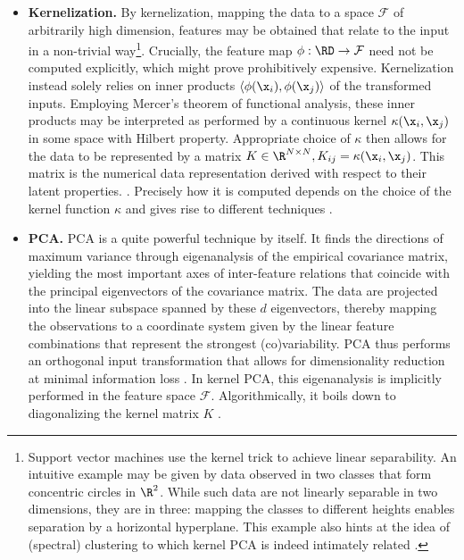 \begin{itemize}

  \item[] \textbf{Kernelization.} By kernelization, mapping the data to a 
  space $\mathcal{F}$ of arbitrarily high dimension, features may be obtained 
  that relate to the input in a non-trivial way\footnote{
  Support vector machines use the kernel trick to achieve linear separability. 
  An intuitive example may be given by data observed in two classes that form 
  concentric circles in $\R^2$. 
  While such data are not linearly separable in two dimensions, they are in three: 
  mapping the classes to different heights enables separation by a horizontal 
  hyperplane.
  This example also hints at the idea of (spectral) clustering to which kernel 
  PCA is indeed intimately related \citep{bengioetal2004}.
  }.
  Crucially, the feature map $\phi: \RD \rightarrow \mathcal{F}$ need not be 
  computed explicitly, which might prove prohibitively expensive.
  Kernelization instead solely relies on inner products $\langle \phi(\x_i), 
  \phi(\x_j) \rangle$ of the transformed inputs.
  Employing Mercer's theorem of functional analysis, these inner products may 
  be interpreted as performed by a continuous kernel 
  $\kappa(\x_i, \x_j)$ in some space with Hilbert property.
  Appropriate choice of $\kappa$ then allows for the data to be represented by a 
  matrix $K \in \R^{N \times N}, K_{ij} = \kappa(\x_i, \x_j)$.
  This matrix is the numerical data representation derived with respect to their 
  latent properties. \citep{schoelkopfetal1998}.
  Precisely how it is computed depends on the choice of the kernel function 
  $\kappa$ and gives rise to different techniques \citep{hametal2003}.
  
  \item[] \textbf{PCA.} PCA is a quite powerful technique by itself.
  It finds the directions of maximum variance through eigenanalysis of the 
  empirical covariance matrix, yielding the most important axes of inter-feature 
  relations that coincide with the principal eigenvectors of the covariance 
  matrix.
  The data are projected into the linear subspace spanned by these $d$ 
  eigenvectors, thereby mapping the observations to a coordinate system given 
  by the linear feature combinations that represent the strongest 
  (co)variability.
  PCA thus performs an orthogonal input transformation that allows for 
  dimensionality reduction at minimal information loss \citep{cayton2005}.
  In kernel PCA, this eigenanalysis is implicitly performed in the feature space 
  $\mathcal{F}$.
  Algorithmically, it boils down to diagonalizing the kernel matrix $K$ 
  \citep{schoelkopfetal1998}.
 
\end{itemize}

